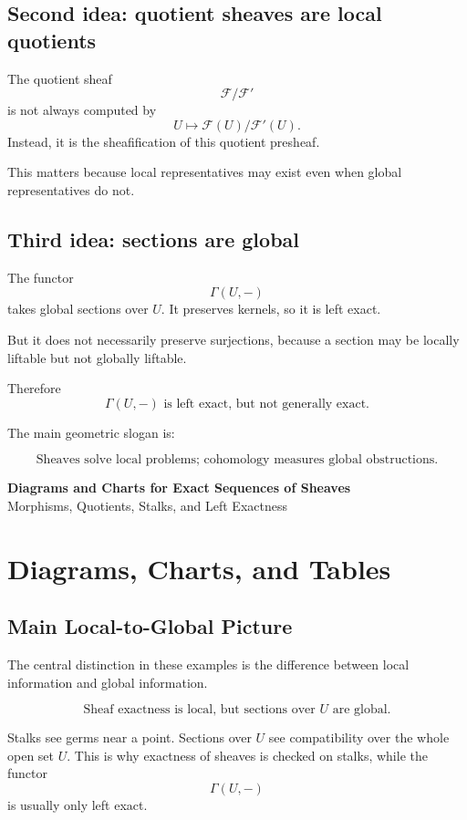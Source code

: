 \documentclass[12pt,a4paper]{article}
\newcommand{\F}{\mathcal F}
\theoremstyle{notespace}
\newcommand{\Fp}{\mathcal F'}      %
\begin{document}
\subsection{Second idea: quotient sheaves are local quotients}

The quotient sheaf
\[
\F/\Fp
\]
is not always computed by
\[
U\mapsto \F(U)/\Fp(U).
\]
Instead, it is the sheafification of this quotient presheaf.

This matters because local representatives may exist even when global representatives do not.

\subsection{Third idea: sections are global}

The functor
\[
\Gamma(U,-)
\]
takes global sections over \(U\). It preserves kernels, so it is left exact.

But it does not necessarily preserve surjections, because a section may be locally liftable but not globally liftable.

Therefore
\[
\boxed{
	\Gamma(U,-)\text{ is left exact, but not generally exact.}
}
\]

The main geometric slogan is:

\[
\boxed{
	\text{Sheaves solve local problems; cohomology measures global obstructions.}
}
\]

\begin{center}
	{\Large \textbf{Diagrams and Charts for Exact Sequences of Sheaves}}\\[0.3cm]
	{\large Morphisms, Quotients, Stalks, and Left Exactness}
\end{center}


\section{Diagrams, Charts, and Tables}

\subsection{Main Local-to-Global Picture}

The central distinction in these examples is the difference between local information and global information.

\[
\boxed{
	\text{Sheaf exactness is local, but sections over }U\text{ are global.}
}
\]

Stalks see germs near a point. Sections over \(U\) see compatibility over the whole open set \(U\). This is why exactness of sheaves is checked on stalks, while the functor
\[
\Gamma(U,-)
\]
is usually only left exact.
\end{document}
